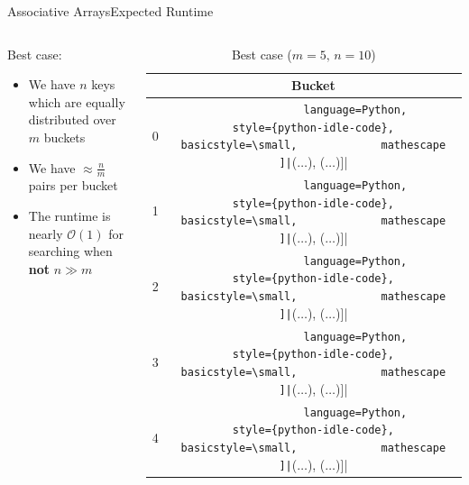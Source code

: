 \begin{frame}{Associative Arrays}{Expected Runtime}
  \begin{columns}
    \begin{column}{0.6\linewidth}
      {\color{Mittel-Blau}Best case}:
      \begin{itemize}
        \item
          We have {\color{Mittel-Blau}$n$} keys which are equally distributed over {\color{Mittel-Blau}$m$} buckets
        \item
          We have {\color{Mittel-Blau}$\approx \frac{n}{m}$} pairs per bucket
        \item
          The runtime is nearly {\color{Mittel-Blau}$\mathcal{O}(1)$} for searching when \textbf{not}
          {\color{Mittel-Blau}$n \gg m$}
      \end{itemize}
    \end{column}
    \begin{column}{0.3\linewidth}
      \begin{table}[!h]
        \caption{Best case ($m = 5, \, n = 10$)}
        \label{tab:hash_table:runtime_best_case}
        \begin{tabularx}{\textwidth}{c|c}
          {} & Bucket\\
          \midrule
          0 & \lstinline[
            language=Python,
            style={python-idle-code},
            basicstyle=\small,
            mathescape
          ]|[($\ldots$), ($\ldots$)]|\\
          1 & \lstinline[
            language=Python,
            style={python-idle-code},
            basicstyle=\small,
            mathescape
          ]|[($\ldots$), ($\ldots$)]|\\
          2 & \lstinline[
            language=Python,
            style={python-idle-code},
            basicstyle=\small,
            mathescape
          ]|[($\ldots$), ($\ldots$)]|\\
          3 & \lstinline[
            language=Python,
            style={python-idle-code},
            basicstyle=\small,
            mathescape
          ]|[($\ldots$), ($\ldots$)]|\\
          4 & \lstinline[
            language=Python,
            style={python-idle-code},
            basicstyle=\small,
            mathescape
          ]|[($\ldots$), ($\ldots$)]|
        \end{tabularx}
      \end{table}
    \end{column}
  \end{columns}
\end{frame}

